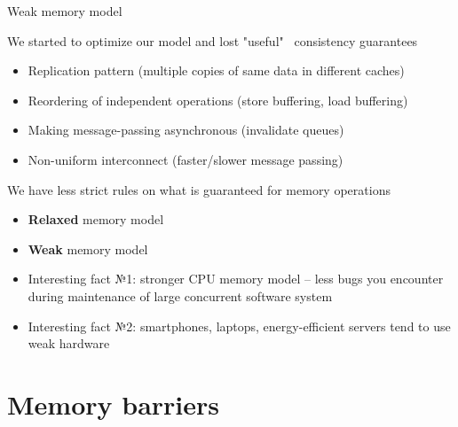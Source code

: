 \begin{frame}{Weak memory model}

We started to optimize our model and lost "useful" \ consistency guarantees
\begin{itemize}
    \item Replication pattern (multiple copies of same data in different caches)
    \item Reordering of independent operations (store buffering, load buffering)
    \item Making message-passing asynchronous (invalidate queues)    
    \item Non-uniform interconnect (faster/slower message passing)
\end{itemize}

\pause
We have less strict rules on what is guaranteed for memory operations
\begin{itemize}
    \item \textbf{Relaxed} memory model
    \item \textbf{Weak} memory model
\end{itemize}

\pause
\begin{itemize}
    \item Interesting fact №1: stronger CPU memory model -- less bugs you encounter during maintenance of large concurrent software system
    \item Interesting fact №2: smartphones, laptops, energy-efficient servers tend to use weak hardware
\end{itemize}

\end{frame}


\section{Memory barriers}
\showTOC

